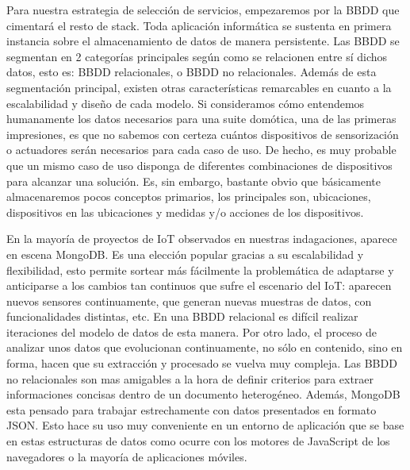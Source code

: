 \vspace{1.5cm}

Para nuestra estrategia de selección de servicios, empezaremos por la BBDD que cimentará el resto de stack. Toda aplicación informática se sustenta en primera instancia sobre el almacenamiento de datos de manera persistente. Las BBDD se segmentan en 2 categorías principales según como se relacionen entre sí dichos datos, esto es: BBDD relacionales, o BBDD no relacionales. Además de esta segmentación principal, existen otras características remarcables en cuanto a la escalabilidad y diseño de cada modelo. Si consideramos cómo entendemos humanamente los datos necesarios para una suite domótica, una de las primeras impresiones, es que no sabemos con certeza cuántos dispositivos de sensorización o actuadores serán necesarios para cada caso de uso. De hecho, es muy probable que un mismo caso de uso disponga de diferentes combinaciones de dispositivos para alcanzar una solución. Es, sin embargo, bastante obvio que básicamente almacenaremos pocos conceptos primarios, los principales son, ubicaciones, dispositivos en las ubicaciones y medidas y/o acciones de los dispositivos.

\vspace{1.5cm}

En la mayoría de proyectos de IoT observados en nuestras indagaciones, aparece en escena MongoDB. Es una elección popular gracias a su escalabilidad y flexibilidad, esto permite sortear más fácilmente la problemática de adaptarse y anticiparse a los cambios tan continuos que sufre el escenario del IoT: aparecen nuevos sensores continuamente, que generan nuevas muestras de datos, con funcionalidades distintas, etc. En una BBDD relacional es difícil realizar iteraciones del modelo de datos de esta manera. Por otro lado, el proceso de analizar unos datos que evolucionan continuamente, no sólo en contenido, sino en forma, hacen que su extracción y procesado se vuelva muy compleja. Las BBDD no relacionales son mas amigables a la hora de definir criterios para extraer informaciones concisas dentro de un documento heterogéneo. Además, MongoDB esta pensado para trabajar estrechamente con datos presentados en formato JSON. Esto hace su uso muy conveniente en un entorno de aplicación que se base en estas estructuras de datos como ocurre con los motores de JavaScript de los navegadores o la mayoría de aplicaciones móviles.

\vspace{1.5cm}

